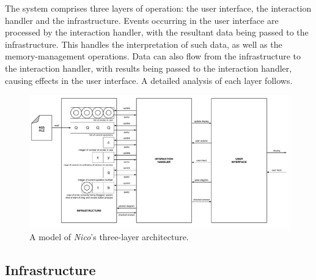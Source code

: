 \documentclass[12pt,twoside,notitlepage,xetex]{report}
\begin{document}
The system comprises three layers of operation: the user interface, the interaction handler and the infrastructure.  Events occurring in the user interface are processed by the interaction handler, with the resultant data being passed to the infrastructure.  This handles the interpretation of such data, as well as the memory-management operations.  Data can also flow from the infrastructure to the interaction handler, with results being passed to the interaction handler, causing effects in the user interface.  A detailed analysis of each layer follows.

\begin{landscape}
\begin{center}
\begin{figure}[H]
\begin{center}
\includegraphics[height=\textheight-2cm]{figs/nico_arch_new.pdf}
\end{center}
\caption{A model of \emph{Nico}'s three-layer architecture.}
\label{fig:NicoArch}
\end{figure}
\end{center}
\end{landscape}
%

\subsection{Infrastructure}
\end{document}
